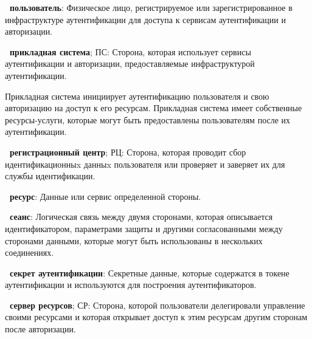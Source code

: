



{\bf \thedefctr~пользователь}:
Физическое лицо, регистрируемое или зарегистрированное в инфраструктуре
аутентификации для доступа к сервисам аутентификации и авторизации.
                

{\bf \thedefctr~прикладная система}; ПС:
Сторона, которая использует сервисы аутентификации и авторизации,
предоставляемые инфраструктурой аутентификации.

\begin{note*}
Прикладная система инициирует аутентификацию пользователя и свою авторизацию на
доступ к его ресурсам.
%
Прикладная система имеет собственные ресурсы-услуги, которые могут быть
предоставлены пользователям после их аутентификации.
\end{note*}

{\bf \thedefctr~регистрационный центр}; РЦ:
Сторона, которая проводит сбор идентификационныx данныx пользователя или 
проверяет и заверяет их для службы идентификации.

{\bf \thedefctr~ресурс}:
Данные или сервис определенной стороны. 

{\bf \thedefctr~сеанс}:
Логическая связь между двумя сторонами, которая описывается идентификатором,
параметрами защиты и другими согласованными между сторонами данными, которые
могут быть использованы в нескольких соединениях.

{\bf \thedefctr~секрет аутентификации}:
Секретные данные, которые содержатся в токене аутентификации и используются для
построения аутентификаторов.

{\bf \thedefctr~сервер ресурсов}; СР:
Сторона, которой пользователи делегировали управление своими ресурсами и которая
открывает доступ к этим ресурсам другим сторонам после авторизации.

